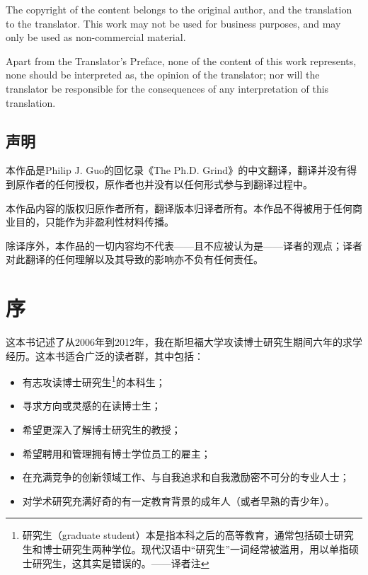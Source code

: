 \documentclass[letter,12pt]{book}
\begin{document}
\begin{CJK}{UTF8}{gbsn}
The copyright of the content belongs to the original author, and the translation to the translator. This work may not be used for business purposes, and may only be used as non-commercial material.

Apart from the Translator's Preface, none of the content of this work represents, none should be interpreted as, the opinion of the translator; nor will the translator be responsible for the consequences of any interpretation of this translation.

\section*{声明}

本作品是Philip J. Guo的回忆录《The Ph.D. Grind》的中文翻译，翻译并没有得到原作者的任何授权，原作者也并没有以任何形式参与到翻译过程中。

本作品内容的版权归原作者所有，翻译版本归译者所有。本作品不得被用于任何商业目的，只能作为非盈利性材料传播。

除译序外，本作品的一切内容均不代表——且不应被认为是——译者的观点；译者对此翻译的任何理解以及其导致的影响亦不负有任何责任。


\mainmatter

\chapter*{序}
\markboth{}{}

这本书记述了从2006年到2012年，我在斯坦福大学攻读博士研究生期间六年的求学经历。这本书适合广泛的读者群，其中包括：

\begin{itemize}
\item 有志攻读博士研究生\footnote{研究生（graduate student）本是指本科之后的高等教育，通常包括硕士研究生和博士研究生两种学位。现代汉语中“研究生”一词经常被滥用，用以单指硕士研究生，这其实是错误的。——译者注}的本科生；
\item 寻求方向或灵感的在读博士生；
\item 希望更深入了解博士研究生的教授；
\item 希望聘用和管理拥有博士学位员工的雇主；
\item 在充满竞争的创新领域工作、与自我追求和自我激励密不可分的专业人士；
\item 对学术研究充满好奇的有一定教育背景的成年人（或者早熟的青少年）。
\end{itemize}



\end{CJK}
\end{document}
